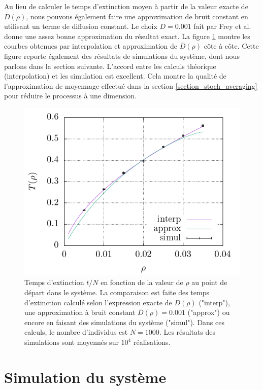 \documentclass[openany,a4paper,12pt]{article}
\begin{document}
\par Au lieu de calculer le temps d'extinction moyen à partir de la valeur exacte de $\bar D(\rho)$, nous pouvons également faire une approximation de bruit constant en utilisant un terme de diffusion constant. Le choix $D=0.001$ fait par Frey et al. \cite{frey2012} donne une assez bonne approximation du résultat exact. La figure \ref{fig:T_extc} montre les courbes obtenues par interpolation et approximation de $\bar D(\rho)$ côte à côte. Cette figure reporte également des résultats de simulations du système, dont nous parlons dans la section suivante. L'accord entre les calculs théorique (interpolation) et les simulation est excellent. Cela montre la qualité de l'approximation de moyennage effectué dans la section \ref{section_stoch_averaging} pour réduire le processus à une dimension.

\begin{figure}[t]
	\centering
	\includegraphics[width=0.9\linewidth]{figures/extc_time_comparison}
	\caption{Temps d'extinction $t/N$ en fonction de la valeur de $\rho$ au point de départ dans le système. La comparaison est faite des temps d'extinction calculé selon l'expression exacte de $\bar D(\rho)$ ("interp"), une approximation à bruit constant $\bar D(\rho)=0.001$ ("approx") ou encore en faisant des simulations du système ("simul"). Dans ces calculs, le nombre d'individus est $N=1000$. Les résultats des simulations sont moyennés sur $10^4$ réalisations.}
	\label{fig:T_extc}
\end{figure}


\section{Simulation du système}
\label{section_simulation}
\end{document}

